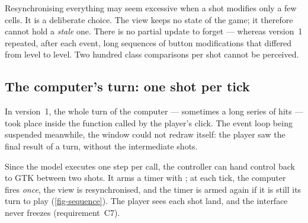Resynchronising everything may seem excessive when a shot modifies only a few cells. It is a
deliberate choice. The view keeps no state of the game; it therefore cannot hold a
\emph{stale} one. There is no partial update to forget --- whereas version~1 repeated, after
each event, long sequences of button modifications that differed from level to level. Two
hundred class comparisons per shot cannot be perceived.

\subsection{The computer's turn: one shot per tick}

\begin{attention}
    In version~1, the whole turn of the computer --- sometimes a long series of hits --- took
    place inside the function called by the player's click. The event loop being suspended
    meanwhile, the window could not redraw itself: the player saw the final result of a turn,
    without the intermediate shots.
\end{attention}

Since the model executes one step per call, the controller can hand control back to GTK
between two shots. It arms a timer with ; at each tick, the computer
fires \emph{once}, the view is resynchronised, and the timer is armed again if it is still
its turn to play (\cref{fig-sequence}). The player sees each shot land, and the interface
never freezes (requirement~C7).

